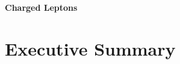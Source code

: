 %

%
\begin{center}
{\Huge\bf Charged Leptons}
\end{center}


\begin{center}\begin{boldmath}






\end{boldmath}\end{center}

\makeatletter
\renewcommand{\paragraph}{\@startsection{paragraph}{4}{0ex}%
   {-3.25ex plus -1ex minus -0.2ex}%
   {1.5ex plus 0.2ex}%
   {\normalfont\normalsize\bfseries}}
\makeatother


\tableofcontents

\chapter{Executive Summary}\label{sec:cl:execsum}
\medskip



